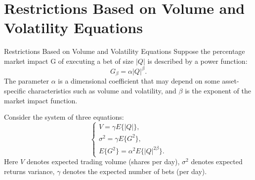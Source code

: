 \documentclass[aspectratio=169]{beamer}
\begin{document}


\section{Restrictions Based on Volume and Volatility Equations}

\begin{frame}{Restrictions Based on Volume and Volatility Equations}
    Suppose the percentage market impact G of executing a bet of size $|Q|$ is described by a power function:
    \begin{equation} \label{restrprice}
        G_\beta = \alpha |Q|^\beta.
    \end{equation}
    The parameter $\alpha$ is a dimensional coefficient that may depend on some asset-specific characteristics
    such as volume and volatility, and $\beta$ is the exponent of the market impact function. \par
    Consider the system of three equations:
    \begin{equation} \label{firstsystem}
        \begin{cases}
            V = \gamma E\{|Q|\},        \\
            \sigma^2 = \gamma E\{G^2\}, \\
            E\{G^2\} = \alpha^2 E\{|Q|^{2 \beta}\}.
        \end{cases}
    \end{equation}
    Here $V$ denotes expected trading volume (shares per day), $\sigma^2$ denotes
    expected returns variance, $\gamma$ denotes the expected number of bets (per day).
    
\end{frame}
\end{document}
